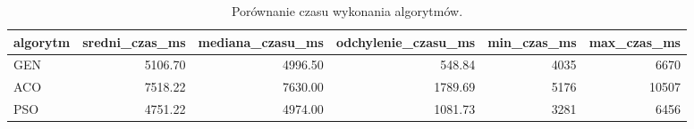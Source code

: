 \begin{table}
\caption{Porównanie czasu wykonania algorytmów.}
\label{tab:czas_wykonania}
\begin{tabular}{lrrrrr}
\toprule
algorytm & sredni_czas_ms & mediana_czasu_ms & odchylenie_czasu_ms & min_czas_ms & max_czas_ms \\
\midrule
GEN & 5106.70 & 4996.50 & 548.84 & 4035 & 6670 \\
ACO & 7518.22 & 7630.00 & 1789.69 & 5176 & 10507 \\
PSO & 4751.22 & 4974.00 & 1081.73 & 3281 & 6456 \\
\bottomrule
\end{tabular}
\end{table}
